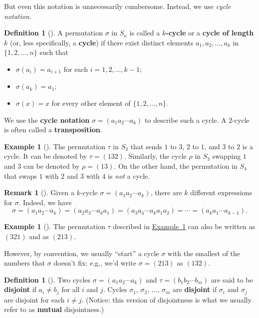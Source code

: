 \documentclass[10pt,]{book}
\newcommand{\terminology}[1]{\textbf{#1}}
\theoremstyle{plain}
\theoremstyle{definition}
\newtheorem{definition}[theorem]{Definition}
\theoremstyle{definition}
\newtheorem{remark}[theorem]{Remark}
\theoremstyle{definition}
\newtheorem{example}[theorem]{Example}
\theoremstyle{definition}
\numberwithin{equation}{section}
\begin{document}
But even this notation is unnecessarily cumbersome. Instead, we use \emph{cycle notation}.%
\begin{definition}[{}]\label{definition-48}
A permutation \(\sigma\) in \(S_n\) is called a \terminology{\(k\)-cycle} or a \terminology{cycle of length \(k\)} (or, less specifically, a \terminology{cycle}) if there exist distinct elements \(a_1,
a_2,\ldots, a_k\) in \(\{1,2,\ldots,n\}\) such that \leavevmode%
\begin{itemize}[label=\textbullet]
\item{}\(\sigma(a_i)=a_{i+1}\) for each \(i=1,2,\ldots, k-1\);%
\item{}\(\sigma(a_k)=a_1\);%
\item{}\(\sigma(x)=x\) for every other element of \(\{1,2,\ldots, n\}\).%
\end{itemize}
%
\par
We use the \terminology{cycle notation} \(\sigma = (a_1 a_2 \cdots a_k)\) to describe such a cycle. A \(2\)-cycle is often called a \terminology{transposition}.%
\end{definition}
\begin{example}[]\label{tr}
The permutation \(\tau\) in \(S_3\) that sends \(1\) to \(3\), \(2\) to \(1\), and \(3\) to \(2\) is a cycle. It can be denoted by \(\tau =(132)\). Similarly, the cycle \(\rho\) in \(S_3\) swapping \(1\) and \(3\) can be denoted by \(\rho=(13)\). On the other hand, the permutation in \(S_4\) that swaps \(1\) with \(2\) and \(3\) with \(4\) is \emph{not} a cycle.%
\end{example}
\begin{remark}[]\label{remark-27}
Given a \(k\)-cycle \(\sigma=(a_1 a_2\cdots a_k)\), there are \(k\) different expressions for \(\sigma\). Indeed, we have%
\begin{equation*}
\sigma=(a_1 a_2\cdots a_k)=(a_2 a_3 \cdots a_k a_1)=(a_3 a_4 \cdots a_k a_1 a_2)=\cdots = (a_k a_1 \cdots a_{k-1}).
\end{equation*}
%
\end{remark}
\begin{example}[]\label{example-53}
The permutation \(\tau\) described in \hyperref[tr]{Example~\ref{tr}} can also be written as \((321)\) and as \((213)\).%
\end{example}
However, by convention, we usually ``start'' a cycle \(\sigma\) with the smallest of the numbers that \(\sigma\) doesn't fix: e.g., we'd write \(\sigma=(213)\) as \((132)\).%
\begin{definition}[{}]\label{definition-49}
Two cycles \(\sigma=(a_1 a_2 \cdots a_k)\) and \(\tau=(b_1
b_2 \cdots b_m)\) are said to be \terminology{disjoint} if \(a_i \neq
b_j\) for all \(i\) and \(j\). Cycles \(\sigma_1\), \(\sigma_2\), \(\ldots\), \(\sigma_m\) are \terminology{disjoint} if \(\sigma_i\) and \(\sigma_j\) are disjoint for each \(i \neq j\). (Notice: this version of disjointness is what we usually refer to as \terminology{mutual} disjointness.)%
\end{definition}
\end{document}
